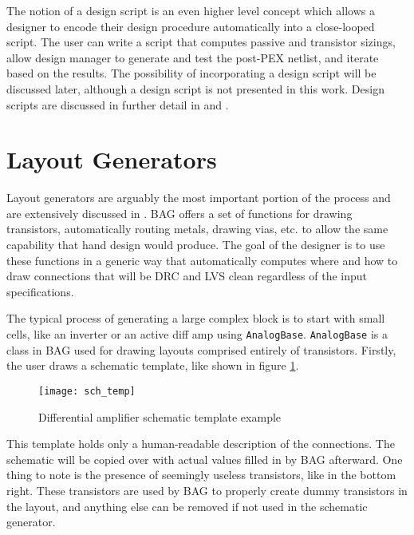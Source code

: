 The notion of a design script is an even higher level concept which allows a designer to encode their design procedure automatically into a close-looped script. The user can write a script that computes passive and transistor sizings, allow design manager to generate and test the post-PEX netlist, and iterate based on the results. The possibility of incorporating a design script will be discussed later, although a design script is not presented in this work. Design scripts are discussed in further detail in \cite{chang_bag2:_2018} and \cite{hakhamaneshi_late_nodate}.

\section{Layout Generators}
Layout generators are arguably the most important portion of the process and are extensively discussed in \cite{chang_bag2:_2018}. BAG offers a set of functions for drawing transistors, automatically routing metals, drawing vias, etc. to allow the same capability that hand design would produce. The goal of the designer is to use these functions in a generic way that automatically computes where and how to draw connections that will be DRC and LVS clean regardless of the input specifications. 

The typical process of generating a large complex block is to start with small cells, like an inverter or an active diff amp using \texttt{AnalogBase}. \texttt{AnalogBase} is a class in BAG used for drawing layouts comprised entirely of transistors. Firstly, the user draws a schematic template, like shown in figure \ref{fig:sch_templ}.
\begin{figure}[h]
\centering
\texttt{[image: sch\_temp]}
\caption{Differential amplifier schematic template example}
\label{fig:sch_templ}
\end{figure}
\clearpage
This template holds only a human-readable description of the connections. The schematic will be copied over with actual values filled in by BAG afterward. One thing to note is the presence of seemingly useless transistors, like in the bottom right. These transistors are used by BAG to properly create dummy transistors in the layout, and anything else can be removed if not used in the schematic generator.

